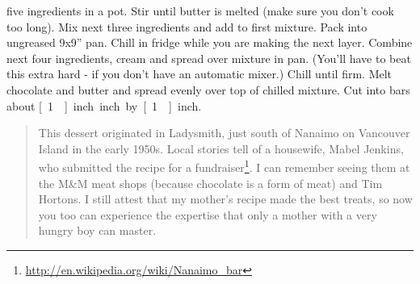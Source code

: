 \documentclass{tufte-book}
\begin{document}
 five ingredients in a pot.  Stir until butter is melted (make sure you don't cook too long).  Mix next three ingredients and add to first mixture.  Pack into ungreased 9x9'' pan.  Chill in fridge while you are making the next layer. Combine next four ingredients, cream and spread over mixture in pan.  (You'll have to beat this extra hard - if you don't have an automatic mixer.)  Chill until firm.  Melt chocolate and butter and spread evenly over top of chilled mixture.  Cut into bars about \unit[1]{inch} inch by \unit[1]{inch}.

\begin{quote}
This dessert originated in Ladysmith, just south of Nanaimo on Vancouver Island in the early 1950s. Local stories tell of a housewife, Mabel Jenkins, who submitted the recipe for a fundraiser\footnote{\url{http://en.wikipedia.org/wiki/Nanaimo_bar}}. I can remember seeing them at the M\&M meat shops (because chocolate is a form of meat) and Tim Hortons. I still attest that my mother's recipe made the best treats, so now you too can experience the expertise that only a mother with a very hungry boy can master.
\end{quote}
\end{document}
